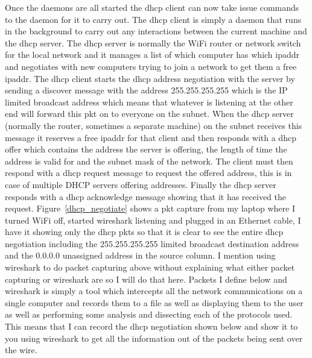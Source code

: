 \documentclass[titlepage]{article}
\begin{document}
Once the \glspl{daemon} are all started the \gls{dhcp} client can now take issue commands to the 
daemon for it to carry out. The \gls{dhcp} client is simply a daemon that runs in the background to 
carry out any interactions between the current machine and the \gls{dhcp} server. The \gls{dhcp} 
server is normally the WiFi router or network switch for the local network and it manages a list of 
which computer has which \gls{ipaddr} and negotiates with new computers trying to join a network to 
get them a free \gls{ipaddr}. The \gls{dhcp} client starts the \gls{dhcp} address negotiation with 
the server by sending a discover message with the address 255.255.255.255 which is the IP limited 
broadcast address which means that whatever is listening at the other end will forward this 
\gls{pkt} on to everyone on the \gls{subnet}. When the \gls{dhcp} \gls{server} (normally the router, 
sometimes a separate machine) on the subnet receives this message it reserves a free \gls{ipaddr} 
for that client and then responds with a \gls{dhcp} offer which contains the address the 
\gls{server} is offering, the length of time the address is valid for and the \gls{subnet} mask of 
the network. The client must then respond with a \gls{dhcp} request message to request the offered 
address, this is in case of multiple DHCP servers offering addresses. Finally the \gls{dhcp} server 
responds with a \gls{dhcp} acknowledge message showing that it has received the request. 
Figure~\ref{dhcp_negotiate} shows a \gls{pkt} capture from my laptop where I turned WiFi off, 
started wireshark listening and plugged in an Ethernet cable, I have it showing only the \gls{dhcp} 
\glspl{pkt} so that it is clear to see the entire \gls{dhcp} negotiation including the 
255.255.255.255 limited broadcast destination address and the 0.0.0.0 unassigned address in the 
source column. I mention using wireshark to do packet capturing above without explaining what either 
packet capturing or wireshark are so I will do that here. Packets I define below and wireshark is 
simply a tool which intercepts all the network communications on a single computer and records them 
to a file as well as displaying them to the user as well as performing some analysis and dissecting 
each of the protocols used. This means that I can record the \gls{dhcp} negotiation shown below and 
show it to you using wireshark to get all the information out of the packets being sent over the 
wire.
\end{document}
